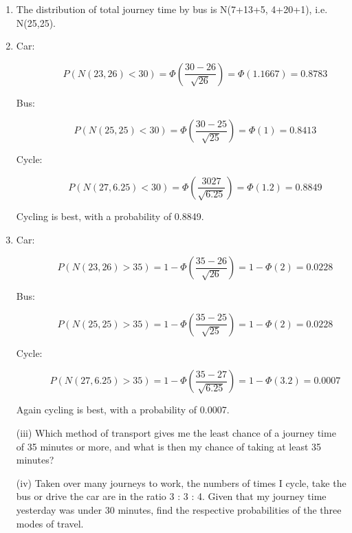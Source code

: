 \documentclass[a4paper,12pt]{article}
\begin{document}
\begin{enumerate}

\item The distribution of total journey time by bus is N(7+13+5, 4+20+1), i.e. N(25,25).


\item

\begin{description}
\item[Car:]
\[P (N(23,26) < 30)  = \Phi \left( \frac{30- 26}{\sqrt{26}} \right)  = \Phi(1.1667) = 0.8783\]



\item[Bus:]
\[P (N(25,25) < 30)  = \Phi \left( \frac{30- 25}{\sqrt{25}} \right)  = \Phi(1) = 0.8413\]

\item[Cycle: ]
\[P (N(27,6.25) < 30)  = \Phi \left( \frac{30 27}{\sqrt{6.25}} \right)  = \Phi(1.2) = 0.8849\]

\end{description}

Cycling is best, with a probability of 0.8849.

\item 
\begin{description}
\item[Car:]
\[P (N(23,26) >35)  = 1- \Phi \left( \frac{35- 26}{\sqrt{26}} \right)  = 1- \Phi(2) = 0.0228\]

\item[Bus:]
\[P (N(25,25) >35)  = 1- \Phi \left( \frac{35- 25}{\sqrt{25}} \right)  = 1- \Phi(2) = 0.0228\]

\item[Cycle: ]
\[P (N(27,6.25) >35)  = 1- \Phi \left( \frac{35- 27}{\sqrt{6.25}} \right)  = 1- \Phi(3.2) = 0.0007\]


\end{description}
Again cycling is best, with a probability of 0.0007.
\newpage
\begin{framed}
(iii) Which method of transport gives me the least chance of a journey time of 35
minutes or more, and what is then my chance of taking at least 35 minutes?
\end{framed}
\begin{framed}
(iv) Taken over many journeys to work, the numbers of times I cycle, take the bus
or drive the car are in the ratio 3 : 3 : 4. Given that my journey time yesterday
was under 30 minutes, find the respective probabilities of the three modes of
travel.


\end{framed}
\end{enumerate}
\end{document}

